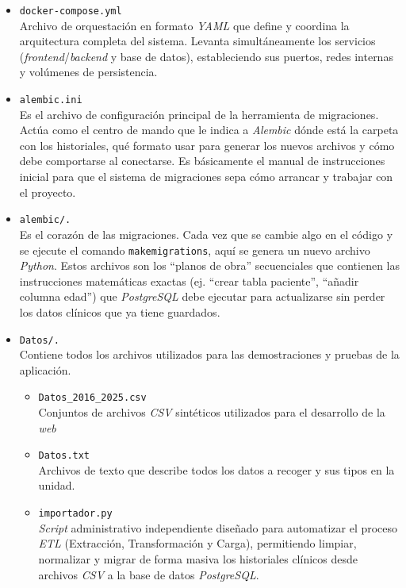 \begin{itemize}
	\item \texttt{docker-compose.yml} \\Archivo de orquestación en formato \textit{YAML} que define y coordina la arquitectura completa del sistema. Levanta simultáneamente los servicios (\textit{frontend}/\textit{backend} y base de datos), estableciendo sus puertos, redes internas y volúmenes de persistencia.
	
	\item \texttt{alembic.ini} \\Es el archivo de configuración principal de la herramienta de migraciones. Actúa como el centro de mando que le indica a \textit{Alembic} dónde está la carpeta con los historiales, qué formato usar para generar los nuevos archivos y cómo debe comportarse al conectarse. Es básicamente el manual de instrucciones inicial para que el sistema de migraciones sepa cómo arrancar y trabajar con el proyecto.
	
	\item \texttt{alembic/.} \\Es el corazón de las migraciones. Cada vez que se cambie algo en el código y se ejecute el comando \texttt{makemigrations}, aquí se genera un nuevo archivo \textit{Python}. Estos archivos son los ``planos de obra'' secuenciales que contienen las instrucciones matemáticas exactas (ej. ``crear tabla paciente'', ``añadir columna edad'') que \textit{PostgreSQL} debe ejecutar para actualizarse sin perder los datos clínicos que ya tiene guardados.
	
	\item \texttt{Datos/.}\\Contiene todos los archivos utilizados para las demostraciones y pruebas de la aplicación.
		\begin{itemize}
			\item \texttt{Datos\_2016\_2025.csv}\\Conjuntos de archivos \textit{CSV} sintéticos utilizados para el desarrollo de la \textit{web}
			
			\item \texttt{Datos.txt}\\Archivos de texto que describe todos los datos a recoger y sus tipos en la unidad.
			
			\item \texttt{importador.py}\\\textit{Script} administrativo independiente diseñado para automatizar el proceso \textit{ETL} (Extracción, Transformación y Carga), permitiendo limpiar, normalizar y migrar de forma masiva los historiales clínicos desde archivos \textit{CSV} a la base de datos \textit{PostgreSQL}.
		\end{itemize}
		

\end{itemize}
